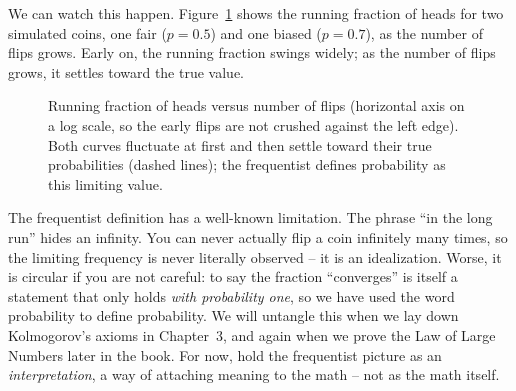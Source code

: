 We can watch this happen. Figure~\ref{ch01:fig-stabilize} shows the running
fraction of heads for two simulated coins, one fair ($p = 0.5$) and one biased
($p = 0.7$), as the number of flips grows. Early on, the running fraction swings widely;
as the number of flips grows, it settles toward the true value.

\begin{figure}[H]
\centering
{}
\caption{Running fraction of heads versus number of flips (horizontal axis on a
log scale, so the early flips are not crushed against the left edge). Both curves
fluctuate at first and then settle toward their true probabilities (dashed
lines); the frequentist defines probability as this limiting value.}
\label{ch01:fig-stabilize}
\end{figure}

\begin{trapbox}
The frequentist definition has a well-known limitation. The phrase ``in the long run'' hides an infinity. You can never actually flip a coin infinitely many times, so the
limiting frequency is never literally observed -- it is an idealization. Worse, it
is circular if you are not careful: to say the fraction ``converges'' is itself a
statement that only holds \emph{with probability one}, so we have used the word
probability to define probability. We will untangle this when we lay down
Kolmogorov's axioms in Chapter~3, and again when we prove the Law of Large
Numbers later in the book. For now, hold the frequentist picture as an
\emph{interpretation}, a way of attaching meaning to the math -- not as the math
itself.
\end{trapbox}


